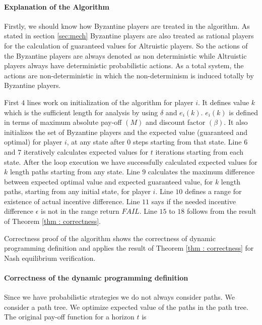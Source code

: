 \paragraph{Explanation of the Algorithm}
Firstly, we should know how Byzantine players are treated in the algorithm. As stated in section \ref{sec:mech} Byzantine players are also treated as rational players for the calculation of guaranteed values for Altruistic players. So the actions of the Byzantine players are always denoted as non deterministic while Altruistic players always have deterministic probabilistic actions. As a total system, the actions are non-deterministic in which the non-determinism is induced totally by Byzantine players.  

First $4$ lines work on initialization of the algorithm for player $i$. It defines value $k$ which is the sufficient length for analysis by using $\delta$ and $e_i(k)$. $e_i(k)$ is defined in terms of maximum absolute pay-off $(M)$ and discount factor $(\beta)$. It also initializes the set of Byzantine players and the expected value (guaranteed and optimal) for player $i$, at any state after $0$ steps starting from that state. Line $6$ and $7$ iteratively calculates expected values for $t$ iterations starting from each state. After the loop execution we have successfully calculated expected values for $k$ length paths starting from any state. Line $9$ calculates the maximum difference between expected optimal value and expected guaranteed value, for $k$ length paths, starting from any initial state, for player $i$. Line $10$ defines a range for existence of actual incentive difference. Line $11$ says if the needed incentive difference $\epsilon$ is not in the range return $FAIL$. Line $15$ to $18$ follows from the result of Theorem \ref{thm : correctness}.  


Correctness proof of the algorithm shows the correctness of dynamic programming definition and applies  the result of Theorem \ref{thm : correctness} for Nash equilibrium verification.

\paragraph{Correctness of the dynamic programming definition}
Since we have probabilistic strategies we do not always consider paths. We consider a path tree. We optimize expected value of the paths in the path tree.
The original pay-off function for a horizon $t$ is \newline

